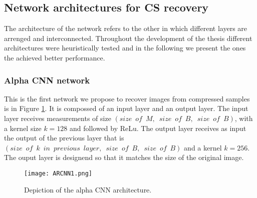 \subsection{Network architectures for CS recovery}
The architecture of the network refers to the other in which different layers are arrenged and interconnected. Throughout the development of the thesis different architectures were heuristically tested and in the following we present the ones the achieved better performance.
\subsubsection{Alpha CNN network}
This is the first network we propose to recover images from compressed samples is in Figure \ref{fig:ARCNNim1}. It is compossed of an input layer and an output layer. The input layer receives measurements of size $(size \enspace of \enspace M ,\enspace size \enspace of \enspace B , \enspace size \enspace of \enspace B)$, with a kernel size $k=128$ and followed by ReLu. The output layer receives as input the output of the previous layer that is $(size \enspace of \enspace k \enspace in \enspace previous \enspace layer ,\enspace size \enspace of \enspace B , \enspace size \enspace of \enspace B)$ and a kernel $k=256$. The ouput layer is designend so that it matches the size of the original image.  
\begin{figure}[tb] 
\centering 
\texttt{[image: ARCNN1.png]} 
\caption[Alpha CNN architecture for recovery ]{Depiction of the alpha CNN architecture.}
\label{fig:ARCNNim1} 
\end{figure}

